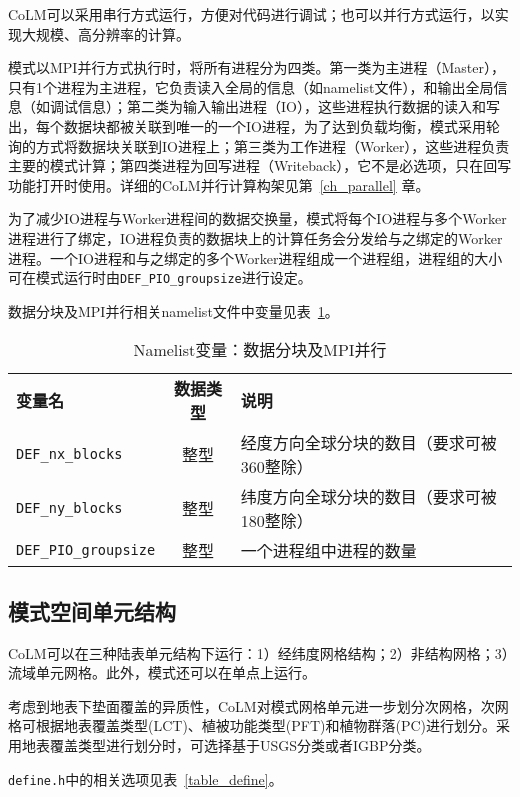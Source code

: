 CoLM可以采用串行方式运行，方便对代码进行调试；也可以并行方式运行，以实现大规模、高分辨率的计算。

模式以MPI并行方式执行时，将所有进程分为四类。第一类为主进程（Master），只有1个进程为主进程，它负责读入全局的信息（如namelist文件），和输出全局信息（如调试信息）；第二类为输入输出进程（IO），这些进程执行数据的读入和写出，每个数据块都被关联到唯一的一个IO进程，为了达到负载均衡，模式采用轮询的方式将数据块关联到IO进程上；第三类为工作进程（Worker），这些进程负责主要的模式计算；第四类进程为回写进程（Writeback），它不是必选项，只在回写功能打开时使用。详细的CoLM并行计算构架见第~\ref{ch_parallel} 章。

为了减少IO进程与Worker进程间的数据交换量，模式将每个IO进程与多个Worker进程进行了绑定，IO进程负责的数据块上的计算任务会分发给与之绑定的Worker进程。一个IO进程和与之绑定的多个Worker进程组成一个进程组，进程组的大小可在模式运行时由\texttt{DEF\_PIO\_groupsize}进行设定。

数据分块及MPI并行相关namelist文件中变量见表~\ref{table_nl_blocks_mpi}。

\begin{table}[!htbp] \small
\caption{Namelist变量：数据分块及MPI并行} \label{table_nl_blocks_mpi}
\centering \renewcommand{\arraystretch}{1.5}
\begin{tabular}{lcl}
\toprule
\textbf{变量名} & \textbf{数据类型} & \textbf{说明} \\
\texttt{DEF\_nx\_blocks} & 整型 & 经度方向全球分块的数目（要求可被360整除）\\
\texttt{DEF\_ny\_blocks} & 整型 & 纬度方向全球分块的数目（要求可被180整除）\\
\texttt{DEF\_PIO\_groupsize} & 整型 & 一个进程组中进程的数量 \\
\bottomrule
\end{tabular}
\end{table}

\subsection{模式空间单元结构}

CoLM可以在三种陆表单元结构下运行：1）经纬度网格结构；2）非结构网格；3）流域单元网格。此外，模式还可以在单点上运行。

考虑到地表下垫面覆盖的异质性，CoLM对模式网格单元进一步划分次网格，次网格可根据地表覆盖类型(LCT)、植被功能类型(PFT)和植物群落(PC)进行划分。采用地表覆盖类型进行划分时，可选择基于USGS分类或者IGBP分类。

\texttt{define.h}中的相关选项见表~\ref{table_define}。

